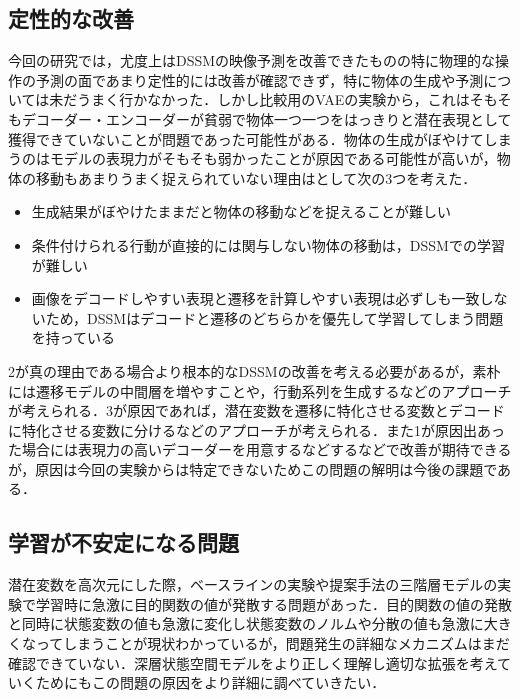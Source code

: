 \subsection{定性的な改善}
今回の研究では，尤度上はDSSMの映像予測を改善できたものの特に物理的な操作の予測の面であまり定性的には改善が確認できず，特に物体の生成や予測については未だうまく行かなかった．しかし比較用のVAEの実験から，これはそもそもデコーダー・エンコーダーが貧弱で物体一つ一つをはっきりと潜在表現として獲得できていないことが問題であった可能性がある．物体の生成がぼやけてしまうのはモデルの表現力がそもそも弱かったことが原因である可能性が高いが，物体の移動もあまりうまく捉えられていない理由はとして次の3つを考えた．
\begin{itemize}
    \item 生成結果がぼやけたままだと物体の移動などを捉えることが難しい
    \item 条件付けられる行動が直接的には関与しない物体の移動は，DSSMでの学習が難しい
    \item 画像をデコードしやすい表現と遷移を計算しやすい表現は必ずしも一致しないため，DSSMはデコードと遷移のどちらかを優先して学習してしまう問題を持っている
\end{itemize}
2が真の理由である場合より根本的なDSSMの改善を考える必要があるが，素朴には遷移モデルの中間層を増やすことや，行動系列を生成するなどのアプローチが考えられる．3が原因であれば，潜在変数を遷移に特化させる変数とデコードに特化させる変数に分けるなどのアプローチが考えられる．また1が原因出あった場合には表現力の高いデコーダーを用意するなどするなどで改善が期待できるが，原因は今回の実験からは特定できないためこの問題の解明は今後の課題である．

\subsection{学習が不安定になる問題}
潜在変数を高次元にした際，ベースラインの実験や提案手法の三階層モデルの実験で学習時に急激に目的関数の値が発散する問題があった．目的関数の値の発散と同時に状態変数の値も急激に変化し状態変数のノルムや分散の値も急激に大きくなってしまうことが現状わかっているが，問題発生の詳細なメカニズムはまだ確認できていない．深層状態空間モデルをより正しく理解し適切な拡張を考えていくためにもこの問題の原因をより詳細に調べていきたい．

